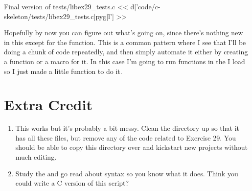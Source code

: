 \begin{code}{Final version of tests/libex29\_tests.c}
<< d['code/c-skeleton/tests/libex29\_tests.c|pyg|l'] >>
\end{code}

Hopefully by now you can figure out what's going on, since there's nothing
new in this except for the  function.  This is a common
pattern where I see that I'll be doing a chunk of code repeatedly, and then
simply automate it either by creating a function or a macro for it.  In this
case I'm going to run functions in the  I load so I just made
a little function to do it.

\section{Extra Credit}

\begin{enumerate}
\item This works but it's probably a bit messy.  Clean the  
    directory up so that it has all these files, but remove any of the code
    related to Exercise 29.  You should be able to copy this directory
    over and kickstart new projects without much editing.
\item Study the  and go read about  syntax
    so you know what it does.  Think you could write a C version of this
    script?
\end{enumerate}


